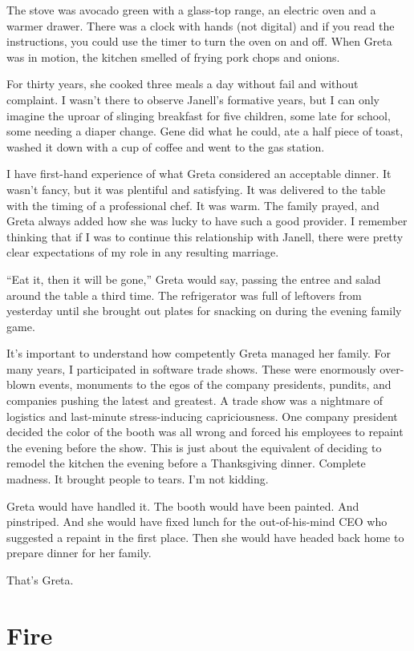 \documentclass[
  letterpaper,
  DIV=11,
  numbers=noendperiod]{scrreprt}
\begin{document}
The stove was avocado green with a glass-top range, an electric oven and
a warmer drawer. There was a clock with hands (not digital) and if you
read the instructions, you could use the timer to turn the oven on and
off. When Greta was in motion, the kitchen smelled of frying pork chops
and onions.

For thirty years, she cooked three meals a day without fail and without
complaint. I wasn't there to observe Janell's formative years, but I can
only imagine the uproar of slinging breakfast for five children, some
late for school, some needing a diaper change. Gene did what he could,
ate a half piece of toast, washed it down with a cup of coffee and went
to the gas station.

I have first-hand experience of what Greta considered an acceptable
dinner. It wasn't fancy, but it was plentiful and satisfying. It was
delivered to the table with the timing of a professional chef. It was
warm. The family prayed, and Greta always added how she was lucky to
have such a good provider. I remember thinking that if I was to continue
this relationship with Janell, there were pretty clear expectations of
my role in any resulting marriage.

``Eat it, then it will be gone,'' Greta would say, passing the entree
and salad around the table a third time. The refrigerator was full of
leftovers from yesterday until she brought out plates for snacking on
during the evening family game.

It's important to understand how competently Greta managed her family.
For many years, I participated in software trade shows. These were
enormously over-blown events, monuments to the egos of the company
presidents, pundits, and companies pushing the latest and greatest. A
trade show was a nightmare of logistics and last-minute stress-inducing
capriciousness. One company president decided the color of the booth was
all wrong and forced his employees to repaint the evening before the
show. This is just about the equivalent of deciding to remodel the
kitchen the evening before a Thanksgiving dinner. Complete madness. It
brought people to tears. I'm not kidding.

Greta would have handled it. The booth would have been painted. And
pinstriped. And she would have fixed lunch for the out-of-his-mind CEO
who suggested a repaint in the first place. Then she would have headed
back home to prepare dinner for her family.

That's Greta.

\section*{Fire}\label{fire}
\end{document}
